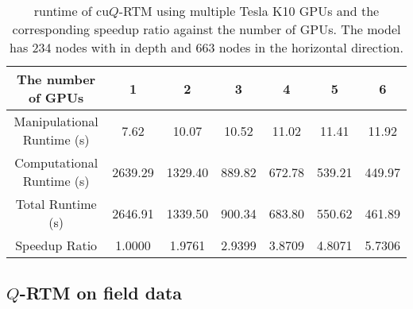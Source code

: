 \begin{table}
\caption{runtime of cu$Q$-RTM using multiple Tesla K10 GPUs and the corresponding speedup ratio against the number of GPUs. The model has 234 nodes with in depth and 663 nodes in the horizontal direction.}
\label{tbl:tab3}
\begin{center}
\begin{tabular}{|c|c|c|c|c|c|c|}
\hline The number of GPUs & 1  & 2 & 3 & 4 & 5 & 6\\
\hline Manipulational Runtime (s) & 7.62 & 10.07 & 10.52 & 11.02 & 11.41 & 11.92\\
\hline Computational Runtime (s) & 2639.29 & 1329.40 & 889.82 & 672.78 & 539.21 & 449.97\\
\hline Total Runtime (s) & 2646.91 & 1339.50 & 900.34 & 683.80 & 550.62 & 461.89\\
\hline Speedup Ratio & 1.0000 & 1.9761 & 2.9399 & 3.8709 & 4.8071 & 5.7306\\
\hline
\end{tabular}
\end{center}
\end{table}





\subsection{$Q$-RTM on field data}

